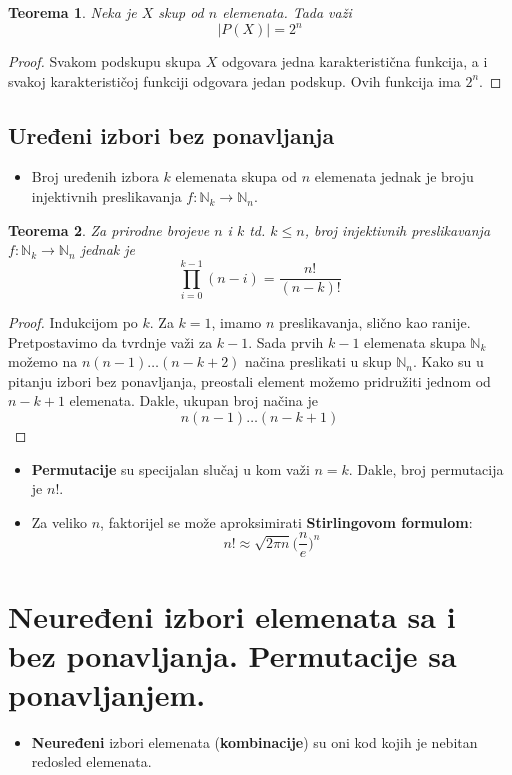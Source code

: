 \documentclass[a4paper,12pt]{article}
\numberwithin{algorithm}{section}
\theoremstyle{plain}
\newtheorem{theorem}{Teorema}[section]
\theoremstyle{definition}
\theoremstyle{remark}
\begin{document}
\begin{theorem}
    Neka je $X$ skup od $n$ elemenata. Tada važi
    \[ |P(X)| = 2^n \]
\end{theorem}
\begin{proof}
    Svakom podskupu skupa $X$ odgovara jedna karakteristična funkcija, a i svakoj karakterističoj funkciji odgovara jedan podskup. Ovih funkcija ima $2^n$.
\end{proof}
\newpage
\subsection{Uređeni izbori bez ponavljanja}
\begin{itemize}
    \item Broj uređenih izbora $k$ elemenata skupa od $n$ elemenata jednak je broju injektivnih preslikavanja $f: \mathbb{N}_k \rightarrow \mathbb{N}_n$.
\end{itemize}
\begin{theorem}
    Za prirodne brojeve $n$ i $k$ td. $k \leq n$, broj injektivnih preslikavanja $f: \mathbb{N}_k \rightarrow \mathbb{N}_n$ jednak je
    \[ \prod_{i = 0}^{k - 1} (n-i)  = \frac{n!}{(n-k)!}\]
\end{theorem}

\begin{proof}
    Indukcijom po $k$. Za $k = 1$, imamo $n$ preslikavanja, slično kao ranije. Pretpostavimo da tvrdnje važi za $k - 1$. Sada prvih $k - 1$ elemenata skupa $\mathbb{N}_k$ možemo na $n(n-1)\dots(n - k + 2)$ načina preslikati u skup $\mathbb{N}_n$. Kako su u pitanju izbori bez ponavljanja, preostali element možemo pridružiti jednom od $n - k + 1$ elemenata. Dakle, ukupan broj načina je 
    \[ n(n-1)\dots (n - k + 1) \]
\end{proof}

\begin{itemize}
    \item \textbf{Permutacije} su specijalan slučaj u kom važi $n = k$. Dakle, broj permutacija je $n!$.
    \item Za veliko $n$, faktorijel se može aproksimirati \textbf{Stirlingovom formulom}: \[ n! \approx \sqrt{2\pi n}\bigg(\frac{n}{e}\bigg)^n \]
\end{itemize}

\section{Neuređeni izbori elemenata sa i bez ponavljanja. Permutacije sa ponavljanjem.}
\begin{itemize}
    \item \textbf{Neuređeni} izbori elemenata (\textbf{kombinacije}) su oni kod kojih je nebitan redosled elemenata.
\end{itemize}
\end{document}
